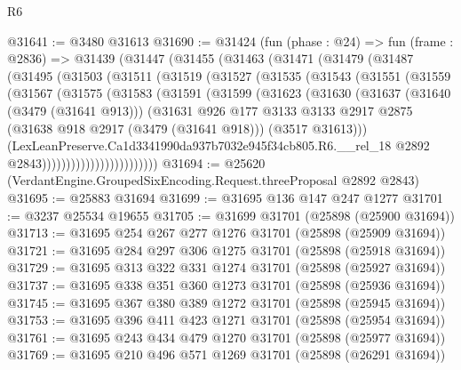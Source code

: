 \begin{lexlean}{R6}
\begin{coremodule}
@31641 := @3480 @31613
@31690 := @31424
    (fun (phase : @24) =>
    fun (frame : @2836) =>
    @31439
      (@31447
        (@31455
          (@31463
            (@31471
              (@31479
                (@31487
                  (@31495
                    (@31503
                      (@31511
                        (@31519
                          (@31527
                            (@31535
                              (@31543
                                (@31551
                                  (@31559
                                    (@31567
                                      (@31575
                                        (@31583
                                          (@31591
                                            (@31599
                                              (@31623
                                                (@31630
                                                  (@31637
                                                    (@31640 (@3479 (@31641 @913)))
                                                    (@31631
                                                      @926
                                                      @177
                                                      @3133
                                                      @3133
                                                      @2917
                                                      @2875
                                                      (@31638 @918 @2917 (@3479 (@31641 @918)))
                                                      (@3517 @31613)))
                                                  (LexLeanPreserve.Ca1d3341990da937b7032e945f34cb805.R6.__rel_18
                                                    @2892
                                                    @2843))))))))))))))))))))))))
@31694 := @25620 (VerdantEngine.GroupedSixEncoding.Request.threeProposal @2892 @2843)
@31695 := @25883 @31694
@31699 := @31695 @136 @147 @247 @1277
@31701 := @3237 @25534 @19655
@31705 := @31699 @31701 (@25898 (@25900 @31694))
@31713 := @31695 @254 @267 @277 @1276 @31701 (@25898 (@25909 @31694))
@31721 := @31695 @284 @297 @306 @1275 @31701 (@25898 (@25918 @31694))
@31729 := @31695 @313 @322 @331 @1274 @31701 (@25898 (@25927 @31694))
@31737 := @31695 @338 @351 @360 @1273 @31701 (@25898 (@25936 @31694))
@31745 := @31695 @367 @380 @389 @1272 @31701 (@25898 (@25945 @31694))
@31753 := @31695 @396 @411 @423 @1271 @31701 (@25898 (@25954 @31694))
@31761 := @31695 @243 @434 @479 @1270 @31701 (@25898 (@25977 @31694))
@31769 := @31695 @210 @496 @571 @1269 @31701 (@25898 (@26291 @31694))

\end{coremodule}
\end{lexlean}
